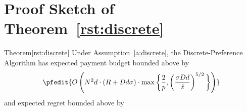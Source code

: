 \section{Proof Sketch of Theorem~\ref{rst:discrete}}
\label{sec:discussion-proof1}

\begin{rtheorem}{Theorem}{\ref{rst:discrete}}
Under Assumption~\ref{a:discrete}, the Discrete-Preference Algorithm has expected payment budget bounded above by 
\begin{align*}
\pfedit{
O \left(\ARMNUM^2  d \cdot (\MAXR + \Diam d \sigma)\cdot
    \max\bigg\{\frac{2}{p},
    \left( \frac{\sigma \Diam d}{\TieCutoff} \right)^{5/2}
    \bigg\}
\right)
}
\end{align*}
and expected regret bounded above by 
\end{rtheorem}

